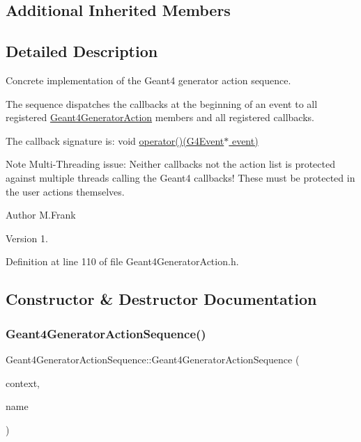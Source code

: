\subsection*{Additional Inherited Members}


\subsection{Detailed Description}
Concrete implementation of the Geant4 generator action sequence. 

The sequence dispatches the callbacks at the beginning of an event to all registered \hyperlink{class_d_d4hep_1_1_simulation_1_1_geant4_generator_action}{Geant4\+Generator\+Action} members and all registered callbacks.

The callback signature is\+: void \hyperlink{class_d_d4hep_1_1_simulation_1_1_geant4_generator_action_sequence_a60e6a124a4d378fbf6a980137f5290cf}{operator()(\+G4\+Event$\ast$ event)}

Note Multi-\/\+Threading issue\+: Neither callbacks not the action list is protected against multiple threads calling the Geant4 callbacks! These must be protected in the user actions themselves.

\begin{DoxyAuthor}{Author}
M.\+Frank 
\end{DoxyAuthor}
\begin{DoxyVersion}{Version}
1. 
\end{DoxyVersion}


Definition at line 110 of file Geant4\+Generator\+Action.\+h.



\subsection{Constructor \& Destructor Documentation}
\hypertarget{class_d_d4hep_1_1_simulation_1_1_geant4_generator_action_sequence_a6a4cf73b83a5ad8f5fb5d2101511dc89}{}\label{class_d_d4hep_1_1_simulation_1_1_geant4_generator_action_sequence_a6a4cf73b83a5ad8f5fb5d2101511dc89} 
\subsubsection{\texorpdfstring{Geant4\+Generator\+Action\+Sequence()}{Geant4GeneratorActionSequence()}}
{\footnotesize\ttfamily Geant4\+Generator\+Action\+Sequence\+::\+Geant4\+Generator\+Action\+Sequence (\begin{DoxyParamCaption}\item[{\hyperlink{class_d_d4hep_1_1_simulation_1_1_geant4_context}{Geant4\+Context} $\ast$}]{context,  }\item[{const std\+::string \&}]{name }\end{DoxyParamCaption})}



